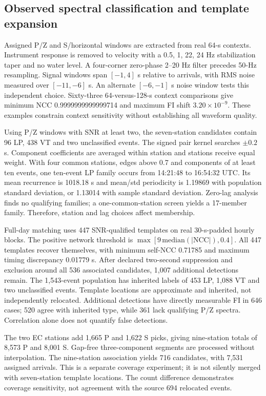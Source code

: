 \documentclass[11pt]{article}
\begin{document}
\subsection{Observed spectral classification and template expansion}
Assigned P/Z and S/horizontal windows are extracted from real 64-s contexts. Instrument response is removed to velocity with a 0.5, 1, 22, 24 Hz stabilization taper and no water level. A four-corner zero-phase 2--20 Hz filter precedes 50-Hz resampling. Signal windows span $[-1,4]$ s relative to arrivals, with RMS noise measured over $[-11,-6]$ s. An alternate $[-6,-1]$ s noise window tests this independent choice. Sixty-three 64-versus-128-s context comparisons give minimum NCC 0.9999999999999714 and maximum FI shift $3.20\times10^{-9}$. These examples constrain context sensitivity without establishing all waveform quality.

Using P/Z windows with SNR at least two, the seven-station candidates contain 96 LP, 438 VT and two unclassified events. The signed pair kernel searches $\pm0.2$ s. Component coefficients are averaged within station and stations receive equal weight. With four common stations, edges above 0.7 and components of at least ten events, one ten-event LP family occurs from 14:21:48 to 16:54:32 UTC. Its mean recurrence is 1018.18 s and mean/std periodicity is 1.19869 with population standard deviation, or 1.13014 with sample standard deviation. Zero-lag analysis finds no qualifying families; a one-common-station screen yields a 17-member family. Therefore, station and lag choices affect membership.

Full-day matching uses 447 SNR-qualified templates on real 30-s-padded hourly blocks. The positive network threshold is $\max[9\,\mathrm{median}(|\mathrm{NCC}|),0.4]$. All 447 templates recover themselves, with minimum self-NCC 0.71785 and maximum timing discrepancy 0.01779 s. After declared two-second suppression and exclusion around all 536 associated candidates, 1,007 additional detections remain. The 1,543-event population has inherited labels of 453 LP, 1,088 VT and two unclassified events. Template locations are approximate and inherited, not independently relocated. Additional detections have directly measurable FI in 646 cases; 520 agree with inherited type, while 361 lack qualifying P/Z spectra. Correlation alone does not quantify false detections.

The two EC stations add 1,665 P and 1,622 S picks, giving nine-station totals of 8,573 P and 8,001 S. Gap-free three-component segments are processed without interpolation. The nine-station association yields 716 candidates, with 7,531 assigned arrivals. This is a separate coverage experiment; it is not silently merged with seven-station template locations. The count difference demonstrates coverage sensitivity, not agreement with the source 694 relocated events.
\end{document}
